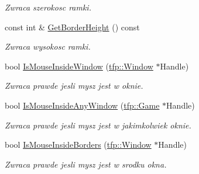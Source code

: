 \begin{DoxyCompactItemize}
\begin{DoxyCompactList}\small\item\em Zwraca szerokosc ramki. \end{DoxyCompactList}\item 
\mbox{\label{classtfp_1_1_window_global_data_class_a65bca1a118d8835ab5679c01ad33a2f9}} 
const int \& \mbox{\hyperlink{classtfp_1_1_window_global_data_class_a65bca1a118d8835ab5679c01ad33a2f9}{Get\+Border\+Height}} () const
\begin{DoxyCompactList}\small\item\em Zwraca wysokosc ramki. \end{DoxyCompactList}\item 
\mbox{\label{classtfp_1_1_window_global_data_class_abd4aeaa7c3b01c6f15131b0390959f31}} 
bool \mbox{\hyperlink{classtfp_1_1_window_global_data_class_abd4aeaa7c3b01c6f15131b0390959f31}{Is\+Mouse\+Inside\+Window}} (\mbox{\hyperlink{classtfp_1_1_window}{tfp\+::\+Window}} $\ast$Handle)
\begin{DoxyCompactList}\small\item\em Zwraca prawde jesli mysz jest w oknie. \end{DoxyCompactList}\item 
\mbox{\label{classtfp_1_1_window_global_data_class_a676dfb5dae2676edb1f5b23c3532ad25}} 
bool \mbox{\hyperlink{classtfp_1_1_window_global_data_class_a676dfb5dae2676edb1f5b23c3532ad25}{Is\+Mouse\+Inside\+Any\+Window}} (\mbox{\hyperlink{classtfp_1_1_game}{tfp\+::\+Game}} $\ast$Handle)
\begin{DoxyCompactList}\small\item\em Zwraca prawde jesli mysz jest w jakimkolwiek oknie. \end{DoxyCompactList}\item 
bool \mbox{\hyperlink{classtfp_1_1_window_global_data_class_ad365639c8a2cbaf542e251dfdcca8ab8}{Is\+Mouse\+Inside\+Borders}} (\mbox{\hyperlink{classtfp_1_1_window}{tfp\+::\+Window}} $\ast$Handle)
\begin{DoxyCompactList}\small\item\em Zwraca prawde jesli mysz jest w srodku okna. \end{DoxyCompactList}\item 
\mbox{\label{classtfp_1_1_window_global_data_class_a7251a03b6e6f762a18e79f14c162da2c}} 

\end{DoxyCompactItemize}
